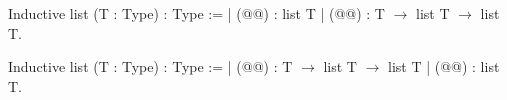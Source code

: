 Inductive list (T : Type) : Type :=
| (@@) : list T
| (@@) :  T $\rightarrow$ list T $\rightarrow$ list T.

Inductive list (T : Type) : Type :=
| (@@) : T $\rightarrow$ list T $\rightarrow$ list T
| (@@) : list T.


